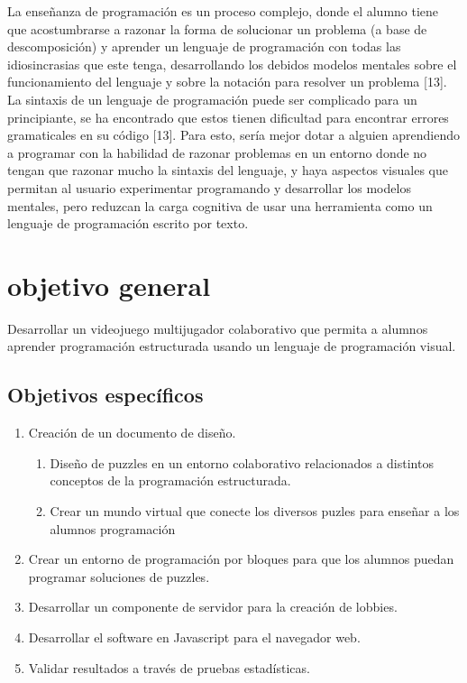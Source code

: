 La enseñanza de programación es un proceso complejo, donde el alumno tiene que acostumbrarse a razonar la forma de solucionar un problema (a base de descomposición) y aprender un lenguaje de programación con todas las idiosincrasias que este tenga, desarrollando los debidos modelos mentales sobre el funcionamiento del lenguaje y sobre la notación para resolver un problema [13]. La sintaxis de un lenguaje de programación puede ser complicado para un principiante, se ha encontrado que estos tienen dificultad para encontrar errores gramaticales en su código [13]. Para esto, sería mejor dotar a alguien aprendiendo a programar con la habilidad de razonar problemas en un entorno donde no tengan que razonar mucho la sintaxis del lenguaje, y haya aspectos visuales que permitan al usuario experimentar programando y desarrollar los modelos mentales, pero reduzcan la carga cognitiva de usar una herramienta como un lenguaje de programación escrito por texto. 


\section{objetivo general}
Desarrollar un videojuego multijugador colaborativo que permita a alumnos aprender programación estructurada usando un lenguaje de programación visual. 

\subsection{Objetivos específicos}

\begin{enumerate}
    \item Creación de un documento de diseño.
    \begin{enumerate}
        \item Diseño de puzzles en un entorno colaborativo relacionados a distintos conceptos de la programación estructurada. 
        \item 	Crear un mundo virtual que conecte los diversos puzles para enseñar a los alumnos programación 
    \end{enumerate}
    \item Crear un entorno de programación por bloques para que los alumnos puedan programar soluciones de puzzles.
    \item Desarrollar un componente de servidor para la creación de lobbies.
    \item Desarrollar el software en Javascript para el navegador web.
    \item Validar resultados a través de pruebas estadísticas.
\end{enumerate}

